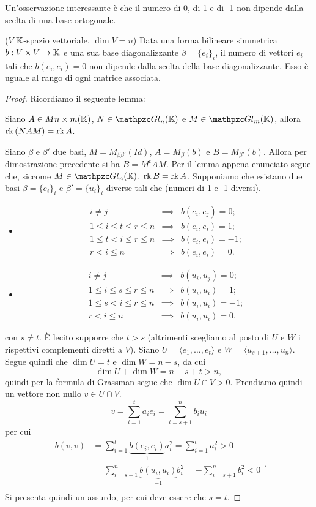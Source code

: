 \documentclass{article}     %
\begin{document}
Un'osservazione interessante è che il numero di 0, di 1 e di -1 non dipende dalla scelta di una base ortogonale.
\begin{shadedTheorem}[Rango]
    ($V$ $\mathbb{K}$-spazio vettoriale, $\dim V=n$) Data una forma bilineare simmetrica $b:V\times V \to \mathbb{K}$ e una sua base diagonalizzante $\beta=\{e_i\}_i$, il numero di vettori $e_i$ tali che $b(e_i,e_i)=0$ non dipende dalla scelta della base diagonalizzante. Esso è uguale al rango di ogni matrice associata.
\end{shadedTheorem}
\begin{proof}
    Ricordiamo il seguente lemma:
    \begin{lemma}
        Siano $A\in M{n\times m}(\mathbb{K})$, $N\in \gln{n}{\K}$ e $M\in \gln{m}{\K}$, allora $\operatorname{rk}\left( NAM \right)=\operatorname{rk} A$.
    \end{lemma}
    Siano $\beta$ e $\beta'$ due basi, $M=M_{\beta\beta'}(Id)$, $A=M_\beta(b)$ e $B=M_{\beta'}(b)$. Allora per dimostrazione precedente si ha $B=M^tAM$. Per il lemma appena enunciato segue che, siccome $M\in \gln{n}{\K}$, $\operatorname{rk} B=\operatorname{rk} A$.
    Supponiamo che esistano due basi $\beta=\{e_i\}_i$ e $\beta'=\{u_i\}_i$ diverse tali che (numeri di 1 e -1 diversi).
    \begin{itemize}
        \item \[\begin{array}{rcl}
            i\neq j & \implies  &b(e_i,e_j)=0;\\
            1\leq i\leq t\leq r\leq n &\implies &b(e_i,e_i)=1;\\
            1\leq t< i\leq r\leq n &\implies &b(e_i,e_i)=-1;\\
            r<i\leq n& \implies & b(e_i,e_i)=0.
        \end{array}\]
        \item \[\begin{array}{rcl}
            i\neq j & \implies  &b(u_i,u_j)=0;\\
            1\leq i\leq s\leq r\leq n &\implies &b(u_i,u_i)=1;\\
            1\leq s< i\leq r\leq n &\implies &b(u_i,u_i)=-1;\\
            r<i\leq n& \implies & b(u_i,u_i)=0.
        \end{array}\]
    \end{itemize}
    con $s\neq t$. È lecito supporre che $t>s$ (altrimenti scegliamo al posto di $U$ e $W$ i rispettivi complementi diretti a $V$). Siano $U=\langle e_1, \dots, e_t\rangle$ e $W=\langle u_{s+1},\dots, u_n\rangle$. Segue quindi che $\dim U=t$ e $\dim W=n-s$, da cui 
    \[\dim U+\dim W=n-s+t>n,\]
    quindi per la formula di Grassman segue che $\dim U\cap V>0$. Prendiamo quindi un vettore non nullo $v\in U\cap V$.
    \[v=\sum_{i=1}^ta_ie_i=\sum_{i=s+1}^nb_iu_i\] 
    per cui
    \[\begin{aligned}
        b(v,v)&=\sum_{i=1}^t\underbrace{b(e_i,e_i)}_1a_i^2= \sum_{i=1}^ta_i^2>0\\
        &=\sum_{i=s+1}^n\underbrace{b(u_i,u_i)}_{-1}b_i^2= -\sum_{i=s+1}^nb_i^2<0\\
    \end{aligned}.\]
    Si presenta quindi un assurdo, per cui deve essere che $s=t$.
\end{proof}
\end{document}
